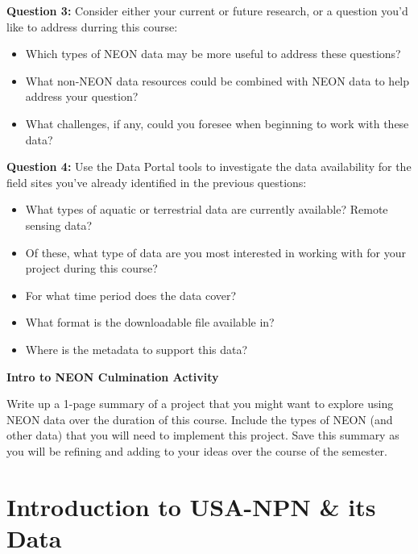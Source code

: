 \documentclass[]{book}
\providecommand{\tightlist}{%
  \setlength{\itemsep}{0pt}\setlength{\parskip}{0pt}}
\begin{document}
\leavevmode\hypertarget{ds-challenge}{}%
\textbf{Question 3:}
Consider either your current or future research, or a question you'd like to
address durring this course:

\begin{itemize}
\tightlist
\item
  Which types of NEON data may be more useful to address these questions?
\item
  What non-NEON data resources could be combined with NEON data to help address your question?
\item
  What challenges, if any, could you foresee when beginning to work with these
  data?
\end{itemize}

\leavevmode\hypertarget{ds-challenge}{}%
\textbf{Question 4:}
Use the Data Portal tools to investigate the data availability for the field
sites you've already identified in the previous questions:

\begin{itemize}
\tightlist
\item
  What types of aquatic or terrestrial data are currently available? Remote sensing data?\\
\item
  Of these, what type of data are you most interested in working with for your project during this course?\\
\item
  For what time period does the data cover?\\
\item
  What format is the downloadable file available in?\\
\item
  Where is the metadata to support this data?\\
\end{itemize}

\textbf{Intro to NEON Culmination Activity}

Write up a 1-page summary of a project that you might want to explore using NEON data over the duration of this course. Include the types of NEON (and other data) that you will need to implement this project. Save this summary as you will be refining and adding to your ideas over the course of the semester.

\hypertarget{introduction-to-usa-npn-its-data}{%
\chapter{Introduction to USA-NPN \& its Data}\label{introduction-to-usa-npn-its-data}}
\end{document}
